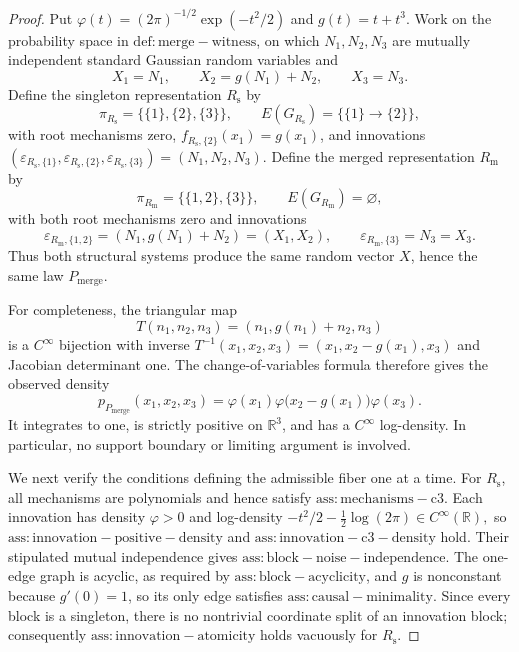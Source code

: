 \documentclass{article}
\begin{document}
\begin{proof}
Put \(\varphi(t)=(2\pi)^{-1/2}\exp(-t^2/2)\) and \(g(t)=t+t^3\).  Work on the probability space in \(\mathrm{def:merge-witness}\), on which \(N_1,N_2,N_3\) are mutually independent standard Gaussian random variables and
\[
 X_1=N_1,\qquad X_2=g(N_1)+N_2,\qquad X_3=N_3.
\]
Define the singleton representation \(R_{\mathrm{s}}\) by
\[
 \pi_{R_{\mathrm{s}}}=\bigl\{\{1\},\{2\},\{3\}\bigr\},
 \qquad E(G_{R_{\mathrm{s}}})=\bigl\{\{1\}\to\{2\}\bigr\},
\]
with root mechanisms zero, \(f_{R_{\mathrm{s}},\{2\}}(x_1)=g(x_1)\), and innovations
\(
 (\varepsilon_{R_{\mathrm{s}},\{1\}},
   \varepsilon_{R_{\mathrm{s}},\{2\}},
   \varepsilon_{R_{\mathrm{s}},\{3\}})=(N_1,N_2,N_3).
\)
Define the merged representation \(R_{\mathrm{m}}\) by
\[
 \pi_{R_{\mathrm{m}}}=\bigl\{\{1,2\},\{3\}\bigr\},
 \qquad E(G_{R_{\mathrm{m}}})=\varnothing,
\]
with both root mechanisms zero and innovations
\[
 \varepsilon_{R_{\mathrm{m}},\{1,2\}}
   =(N_1,g(N_1)+N_2)=(X_1,X_2),
 \qquad
 \varepsilon_{R_{\mathrm{m}},\{3\}}=N_3=X_3.
\]
Thus both structural systems produce the same random vector \(X\), hence the same law \(P_{\mathrm{merge}}\).

For completeness, the triangular map
\[
 T(n_1,n_2,n_3)=(n_1,g(n_1)+n_2,n_3)
\]
is a \(C^\infty\) bijection with inverse
\(
 T^{-1}(x_1,x_2,x_3)=(x_1,x_2-g(x_1),x_3)
\)
and Jacobian determinant one.  The change-of-variables formula therefore gives the observed density
\[
 p_{P_{\mathrm{merge}}}(x_1,x_2,x_3)
   =\varphi(x_1)\varphi\bigl(x_2-g(x_1)\bigr)\varphi(x_3).
\]
It integrates to one, is strictly positive on \(\mathbb R^3\), and has a \(C^\infty\) log-density.  In particular, no support boundary or limiting argument is involved.

We next verify the conditions defining the admissible fiber one at a time.  For \(R_{\mathrm{s}}\), all mechanisms are polynomials and hence satisfy \(\mathrm{ass:mechanisms-c3}\).  Each innovation has density \(\varphi>0\) and log-density
\(
 -t^2/2-\tfrac12\log(2\pi)\in C^\infty(\mathbb R),
\)
so \(\mathrm{ass:innovation-positive-density}\) and \(\mathrm{ass:innovation-c3-density}\) hold.  Their stipulated mutual independence gives \(\mathrm{ass:block-noise-independence}\).  The one-edge graph is acyclic, as required by \(\mathrm{ass:block-acyclicity}\), and \(g\) is nonconstant because \(g'(0)=1\), so its only edge satisfies \(\mathrm{ass:causal-minimality}\).  Since every block is a singleton, there is no nontrivial coordinate split of an innovation block; consequently \(\mathrm{ass:innovation-atomicity}\) holds vacuously for \(R_{\mathrm{s}}\).


\end{proof}
\end{document}
